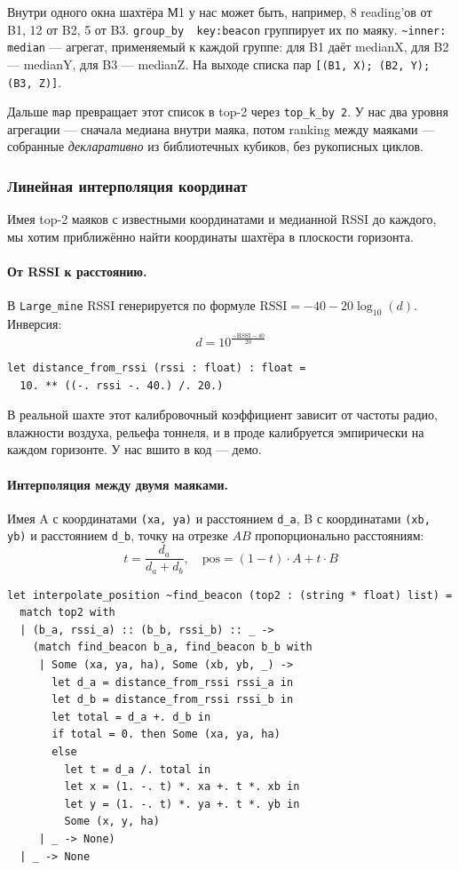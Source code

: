 Внутри одного окна шахтёра М1 у нас может быть, например, 8
reading'ов от B1, 12 от B2, 5 от B3. \texttt{group\_by ~key:beacon}
группирует их по маяку. \texttt{\textasciitilde inner: median} ---
агрегат, применяемый к каждой группе: для B1 даёт medianX,
для B2 --- medianY, для B3 --- medianZ. На выходе списка пар
\texttt{[(B1, X); (B2, Y); (B3, Z)]}.

Дальше \texttt{map} превращает этот список в top-2 через
\texttt{top\_k\_by 2}. У нас два уровня агрегации --- сначала
медиана внутри маяка, потом ranking между маяками --- собранные
\emph{декларативно} из библиотечных кубиков, без рукописных циклов.

\subsubsection{Линейная интерполяция координат}\label{sssec:interpolate}

Имея top-2 маяков с известными координатами и медианной RSSI до
каждого, мы хотим приближённо найти координаты шахтёра в плоскости
горизонта.

\paragraph{От RSSI к расстоянию.} В \texttt{Large\_mine} RSSI
генерируется по формуле $\text{RSSI} = -40 - 20 \log_{10}(d)$.
Инверсия:
$$d = 10^{\frac{-\text{RSSI} - 40}{20}}$$

\begin{lstlisting}
let distance_from_rssi (rssi : float) : float =
  10. ** ((-. rssi -. 40.) /. 20.)
\end{lstlisting}

В реальной шахте этот калибровочный коэффициент зависит от частоты
радио, влажности воздуха, рельефа тоннеля, и в проде калибруется
эмпирически на каждом горизонте. У нас вшито в код --- демо.

\paragraph{Интерполяция между двумя маяками.} Имея A с координатами
\texttt{(xa, ya)} и расстоянием \texttt{d\_a}, B с координатами
\texttt{(xb, yb)} и расстоянием \texttt{d\_b}, точку на отрезке
$AB$ пропорционально расстояниям:
$$t = \frac{d_a}{d_a + d_b}, \quad
\text{pos} = (1 - t) \cdot A + t \cdot B$$

\begin{lstlisting}
let interpolate_position ~find_beacon (top2 : (string * float) list) =
  match top2 with
  | (b_a, rssi_a) :: (b_b, rssi_b) :: _ ->
    (match find_beacon b_a, find_beacon b_b with
     | Some (xa, ya, ha), Some (xb, yb, _) ->
       let d_a = distance_from_rssi rssi_a in
       let d_b = distance_from_rssi rssi_b in
       let total = d_a +. d_b in
       if total = 0. then Some (xa, ya, ha)
       else
         let t = d_a /. total in
         let x = (1. -. t) *. xa +. t *. xb in
         let y = (1. -. t) *. ya +. t *. yb in
         Some (x, y, ha)
     | _ -> None)
  | _ -> None
\end{lstlisting}

